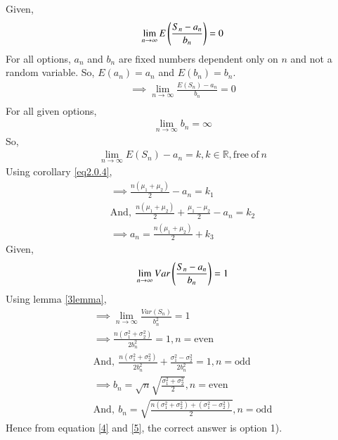 \documentclass[journal,12pt,twocolumn]{IEEEtran}
\begin{document}
Given,
\begin{align}
    \lim_{n \to\infty}E\left(\frac{S_n-a_n}{b_n}\right)=0
\end{align}
For all options, $a_n$ and $b_n$ are fixed numbers dependent only on $n$ and not a random variable. So, $E(a_n)=a_n$ and $E(b_n)=b_n$.
\begin{align}
    \implies \lim_{n \to\infty}\frac{E(S_n)-a_n}{b_n}=0\\
\end{align}
For all given options, 
\begin{align}
\lim_{n \to\infty}b_n=\infty 
\end{align}
So,
\begin{align}
\lim_{n \to\infty}E(S_n)-a_n=k, k\in\mathbb{R}, \mathrm{free\:of\:}n
\end{align}
Using corollary \eqref{eq2.0.4}, 
\begin{align}
\implies \frac{n(\mu_1+\mu_2)}{2}-a_n=k_1\\
\mathrm{And,\:}\frac{n(\mu_1+\mu_2)}{2}+\frac{\mu_1-\mu_2}{2}-a_n=k_2\\
\boxed{\implies a_n=\frac{n(\mu_1+\mu_2)}{2}+k_3\label{5}}
\end{align}
Given,
\begin{align}
    \lim_{n\to\infty}Var\left(\frac{S_n-a_n}{b_n}\right)=1
\end{align}
Using lemma \eqref{3lemma},
\begin{align}
    \implies \lim_{n\to\infty}\frac{Var(S_n)}{b_n^2}=1\\
    \implies \frac{n(\sigma_1^2+\sigma_2^2)}{2b_n^2}=1,n=\mathrm{even}\\
    \mathrm{And,\:}\frac{n(\sigma_1^2+\sigma_2^2)}{2b_n^2}+\frac{\sigma_1^2-\sigma_2^2}{2b_n^2}=1,n=\mathrm{odd}\\
    \boxed{\implies b_n=\sqrt{n}\sqrt{\frac{\sigma_1^2+\sigma_2^2}{2}},n=\mathrm{even}\label{4}}\\
    \mathrm{And,\:}b_n=\sqrt{\frac{n(\sigma_1^2+\sigma_2^2)+(\sigma_1^2-\sigma_2^2)}{2}},n=\mathrm{odd}
\end{align}
Hence from equation \eqref{4} and \eqref{5}, the correct answer is option 1).
\end{document}
